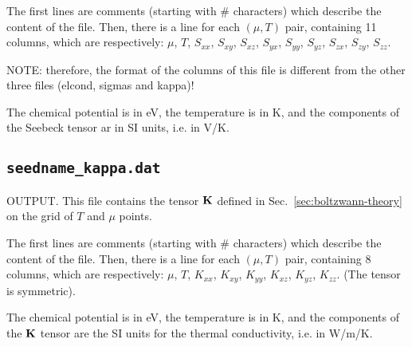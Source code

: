 The first lines are comments (starting with \# characters) which describe the content of the file.
Then, there is a line for each $(\mu,T)$ pair, containing 11 columns, which are respectively: $\mu$, $T$, $S_{xx}$, $S_{xy}$, $S_{xz}$, $S_{yx}$, $S_{yy}$, $S_{yz}$, $S_{zx}$, $S_{zy}$, $S_{zz}$.

NOTE: therefore, the format of the columns of this file is different from the other three files (elcond, sigmas and kappa)!

The chemical potential is in eV, the temperature is in K, and the components of the Seebeck tensor ar in SI units, i.e. in V/K.

\subsection{{\tt seedname\_kappa.dat}}
OUTPUT. This file contains the tensor $\bm{\mathrm{K}}$ defined in Sec.~\ref{sec:boltzwann-theory} on the grid of $T$ and $\mu$ points.

The first lines are comments (starting with \# characters) which describe the content of the file.
Then, there is a line for each $(\mu,T)$ pair, containing 8 columns, which are respectively: $\mu$, $T$, $K_{xx}$, $K_{xy}$, $K_{yy}$, $K_{xz}$, $K_{yz}$, $K_{zz}$. (The tensor is symmetric).

The chemical potential is in eV, the temperature is in K, and the components of the $\bm{\mathrm{K}}$ tensor are the SI units for the thermal conductivity, i.e. in W/m/K.

